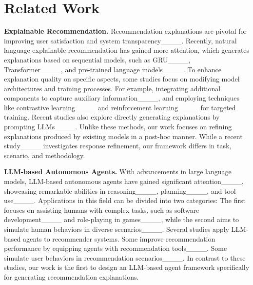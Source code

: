 \section{Related Work}
\label{sec:related_work}

\textbf{Explainable Recommendation.}
Recommendation explanations are pivotal for improving user satisfaction and system transparency____. 
Recently, natural language explainable recommendation has gained more attention, which generates explanations based on sequential models, such as GRU____, Transformer____, and pre-trained language models____.
To enhance explanation quality on specific aspects, some studies focus on modifying model architectures and training processes.
For example, integrating additional components to capture auxiliary information____,  
and employing techniques like contrastive learning____ and reinforcement learning____ for targeted training.
Recent studies also explore directly generating explanations by prompting LLMs____.
Unlike these methods, our work focuses on refining explanations produced by existing models in a post-hoc manner. 
While a recent study____ investigates response refinement, our framework differs in task, scenario, and methodology.

\textbf{LLM-based Autonomous Agents.}
With advancements in large language models, LLM-based autonomous agents have gained significant attention____, showcasing remarkable abilities in reasoning____, planning____, and tool use____. 
Applications in this field can be divided into two categories:
The first focuses on assisting humans with complex tasks, such as software development____ and role-playing in games____, while the second aims to simulate human behaviors in diverse scenarios____.
Several studies apply LLM-based agents to recommender systems.
Some improve recommendation performance by equipping agents with recommendation tools____.
Some simulate user behaviors in recommendation scenarios____.
In contrast to these studies, our work is the first to design an LLM-based agent framework specifically for generating recommendation explanations.